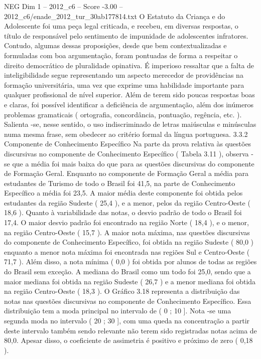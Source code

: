 \begin{textsample}{NEG Dim 1 – 2012\_c6 – Score -3.00 – 2012\_c6/enade\_2012\_tur\_30ab177814.txt}
O Estatuto da Criança e do Adolescente foi uma peça legal criticada, e recebeu, em diversas respostas, o título de responsável pelo sentimento de impunidade de adolescentes infratores.
Contudo, algumas dessas proposições, desde que bem contextualizadas e formuladas com boa argumentação, foram pontuadas de forma a respeitar o direito democrático de pluralidade opinativa.
É imperioso ressaltar que a falta de inteligibilidade segue representando um aspecto merecedor de providências na formação universitária, uma vez que exprime uma habilidade importante para qualquer profissional de nível superior.
Além de terem sido poucas respostas boas e claras, foi possível identificar a deficiência de argumentação, além dos inúmeros problemas gramaticais ( ortografia, concordância, pontuação, regência, etc. ).
Salienta -se, nesse sentido, o uso indiscriminado de letras maiúsculas e minúsculas numa mesma frase, sem obedecer ao critério formal da língua portuguesa. 3.3.2 Componente de Conhecimento Específico Na parte da prova relativa às questões discursivas no componente de Conhecimento Específico ( Tabela 3.11 ), observa -se que a média foi mais baixa do que para as questões discursivas do componente de Formação Geral.
Enquanto no componente de Formação Geral a média para estudantes de Turismo de todo o Brasil foi 41,5, na parte de Conhecimento Específico a média foi 23,5.
A maior média deste componente foi obtida pelos estudantes da região Sudeste ( 25,4 ), e a menor, pelos da região Centro-Oeste ( 18,6 ).
Quanto à variabilidade das notas, o desvio padrão de todo o Brasil foi 17,4.
O maior desvio padrão foi encontrado na região Norte ( 18,4 ), e o menor, na região Centro-Oeste ( 15,7 ).
A maior nota máxima, nas questões discursivas do componente de Conhecimento Específico, foi obtida na região Sudeste ( 80,0 ) enquanto a menor nota máxima foi encontrada nas regiões Sul e Centro-Oeste ( 71,7 ).
Além disso, a nota mínima ( 0,0 ) foi obtida por alunos de todas as regiões do Brasil sem exceção.
A mediana do Brasil como um todo foi 25,0, sendo que a maior mediana foi obtida na região Sudeste ( 26,7 ) e a menor mediana foi obtida na região Centro-Oeste ( 18,3 ).
O Gráfico 3.18 representa a distribuição das notas nas questões discursivas no componente de Conhecimento Específico.
Essa distribuição tem a moda principal no intervalo de ( 0 ; 10 ].
Nota -se uma segunda moda no intervalo ( 20 ; 30 ], com uma queda na concentração a partir deste intervalo também sendo relevante não terem sido registradas notas acima de 80,0.
Apesar disso, o coeficiente de assimetria é positivo e próximo de zero ( 0,18 ).

\end{textsample}
